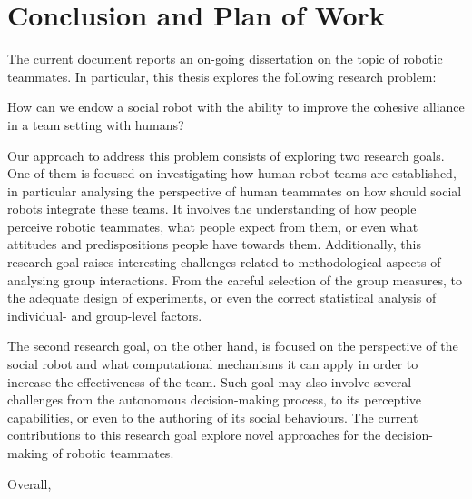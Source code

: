 
\chapter{Conclusion and Plan of Work}
\label{chapter:conclusion}

The current document reports an on-going dissertation on the topic of robotic teammates. In particular, this thesis explores the following research problem:


\begin{indented}
How can we endow a social robot with the ability to improve the cohesive alliance in a team setting with humans?
\end{indented}

Our approach to address this problem consists of exploring two research goals. One of them is focused on investigating how human-robot teams are established, in particular analysing the perspective of human teammates on how should social robots integrate these teams. It involves the understanding of how people perceive robotic teammates, what people expect from them, or even what attitudes and predispositions people have towards them. Additionally, this research goal raises interesting challenges related to methodological aspects of analysing group interactions. From the careful selection of the group measures, to the adequate design of experiments, or even the correct statistical analysis of individual- and group-level factors.

The second research goal, on the other hand, is focused on the perspective of the social robot and what computational mechanisms it can apply in order to increase the effectiveness of the team. Such goal may also involve several challenges from the autonomous decision-making process, to its perceptive capabilities, or even to the authoring of its social behaviours. The current contributions to this research goal explore novel approaches for the decision-making of robotic teammates.

Overall, 

